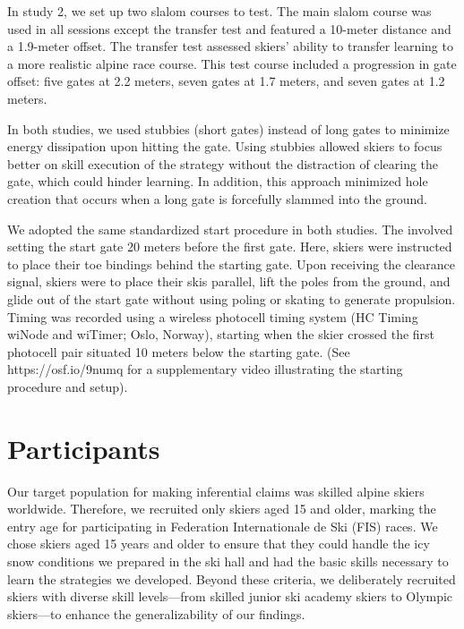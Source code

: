 In study 2, we set up two slalom courses to test. The main slalom course was used in all sessions except the transfer test and featured a 10-meter distance and a 1.9-meter offset. The transfer test assessed skiers' ability to transfer learning to a more realistic alpine race course. This test course included a progression in gate offset: five gates at 2.2 meters, seven gates at 1.7 meters, and seven gates at 1.2 meters. 

In both studies, we used stubbies (short gates) instead of long gates to minimize energy dissipation upon hitting the gate\cite{minetti_biomechanics_2018}. Using stubbies allowed skiers to focus better on skill execution of the strategy without the distraction of clearing the gate, which could hinder learning. In addition, this approach minimized hole creation that occurs when a long gate is forcefully slammed into the ground. 

We adopted the same standardized start procedure in both studies. The involved setting the start gate 20 meters before the first gate. Here, skiers were instructed to place their toe bindings behind the starting gate. Upon receiving the clearance signal, skiers were to place their skis parallel, lift the poles from the ground, and glide out of the start gate without using poling or skating to generate propulsion. Timing was recorded using a wireless photocell timing system (HC Timing wiNode and wiTimer; Oslo, Norway), starting when the skier crossed the first photocell pair situated 10 meters below the starting gate. (See https://osf.io/9numq for a supplementary video illustrating the starting procedure and setup).


\section{Participants}
Our target population for making inferential claims was skilled alpine skiers worldwide. Therefore, we recruited only skiers aged 15 and older, marking the entry age for participating in Federation Internationale de Ski (FIS) races. We chose skiers aged 15 years and older to ensure that they could handle the icy snow conditions we prepared in the ski hall and had the basic skills necessary to learn the strategies we developed. Beyond these criteria, we deliberately recruited skiers with diverse skill levels—from skilled junior ski academy skiers to Olympic skiers—to enhance the generalizability of our findings.

